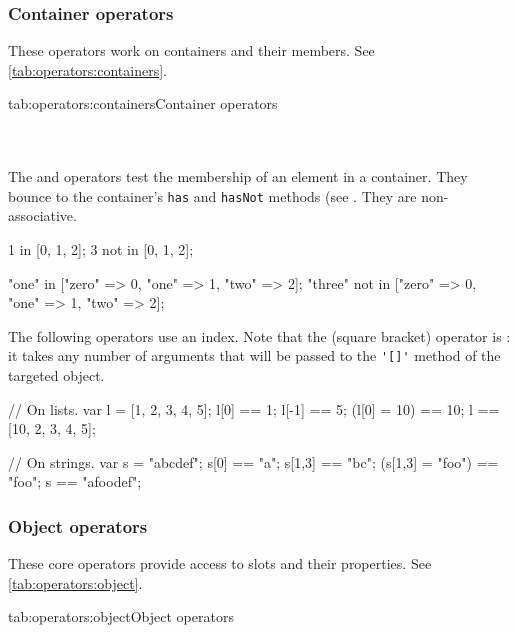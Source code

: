 \subsubsection{Container operators}
\label{sec:lang:op:containers}

These operators work on containers and their members. See
\autoref{tab:operators:containers}.
\begin{operatorTable}{tab:operators:containers}{Container operators}
  \operatorsub\\\operatorsubass
  \\\hline
  \operatorin\\\operatornotin
\end{operatorTable}

The  and  operators test the membership of an element in
a container.  They bounce to the container's \lstinline{has} and
\lstinline{hasNot} methods (see .  They are
non-associative.

\begin{urbiassert}
1     in [0, 1, 2];
3 not in [0, 1, 2];

"one"   in     ["zero" => 0, "one" => 1, "two" => 2];
"three" not in ["zero" => 0, "one" => 1, "two" => 2];
\end{urbiassert}

The following operators use an index. Note that the
 (square bracket) operator is
: it takes any number of arguments that will be passed to the
\lstinline|'[]'| method of the targeted object.

\begin{urbiassert}
// On lists.
var l = [1, 2, 3, 4, 5];
  l[0] == 1;
  l[-1] == 5;
  (l[0] = 10) == 10;
  l == [10, 2, 3, 4, 5];

// On strings.
var s = "abcdef";
  s[0] == "a";
  s[1,3] == "bc";
  (s[1,3] = "foo") == "foo";
  s == "afoodef";
\end{urbiassert}


\subsubsection{Object operators}

These core operators provide access to slots and their properties. See
\autoref{tab:operators:object}.


\begin{operatorTable}{tab:operators:object}{Object operators}
  \operatordot\\\operatordota
  \\\hline
  \operatorprop\\\operatorpropass
  \\\hline
  \operatoruand\\\operatordotand
\end{operatorTable}

